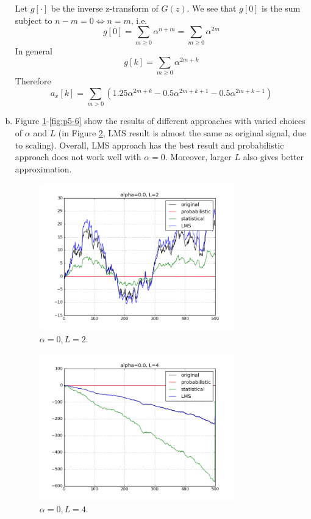 \begin{enumerate}[(a)]
Let $g[\cdot]$ be the inverse z-transform of $G(z)$. We see that $g[0]$ is the sum subject to $n - m = 0 \Leftrightarrow n = m$, i.e.
\[g[0] = \sum_{m \geq 0} \alpha^{n+m} = \sum_{m \geq 0} \alpha^{2m}\]
In general
\[g[k] = \sum_{m \geq 0} \alpha^{2m+k}\]
Therefore
\[a_x[k] = \sum_{m > 0} (1.25 \alpha^{2m+k} - 0.5 \alpha^{2m+k+1} - 0.5 \alpha^{2m+k-1})\]

\item Figure \ref{fig:p5-1}-\ref{fig:p5-6} show the results of different approaches with varied choices of $\alpha$ and $L$ (in Figure \ref{fig:p5-2}, LMS result is almost the same as original signal, due to scaling). Overall, LMS approach has the best result and probabilistic approach does not work well with $\alpha = 0$. Moreover, larger $L$ also gives better approximation.
\begin{figure}[htbp]
	\centering
	\includegraphics[width=0.8\textwidth]{images/p5-1}
	\caption{$\alpha=0, L=2$.}
	\label{fig:p5-1}
\end{figure}

\begin{figure}[htbp]
	\centering
	\includegraphics[width=0.8\textwidth]{images/p5-2}
	\caption{$\alpha=0, L=4$.}
	\label{fig:p5-2}
\end{figure}


\end{enumerate}
